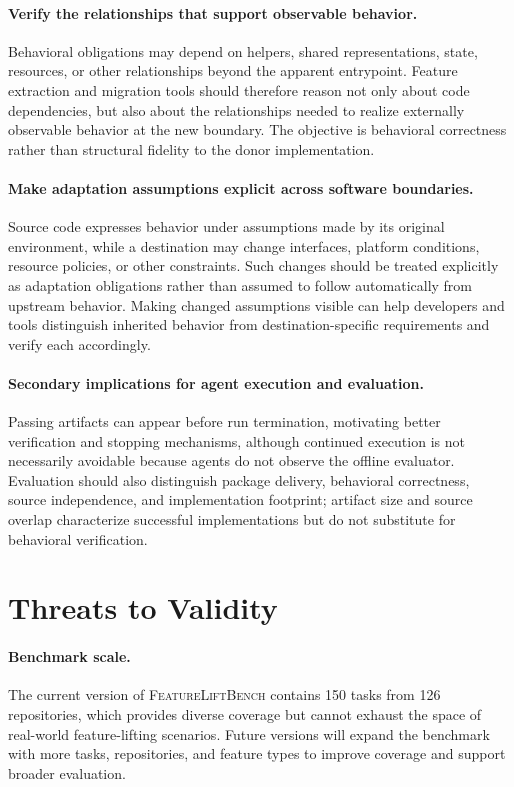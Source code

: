 \documentclass[acmsmall,screen,review,anonymous]{acmart}
\newcommand{\flb}{\textsc{FeatureLiftBench}\xspace}
\begin{document}
\paragraph{Verify the relationships that support observable behavior.}
Behavioral obligations may depend on helpers, shared representations, state,
resources, or other relationships beyond the apparent entrypoint. Feature
extraction and migration tools should therefore reason not only about code
dependencies, but also about the relationships needed to realize externally
observable behavior at the new boundary. The objective is behavioral
correctness rather than structural fidelity to the donor implementation.

\paragraph{Make adaptation assumptions explicit across software boundaries.}
Source code expresses behavior under assumptions made by its original
environment, while a destination may change interfaces, platform conditions,
resource policies, or other constraints. Such changes should be treated
explicitly as adaptation obligations rather than assumed to follow automatically
from upstream behavior. Making changed assumptions visible can help developers
and tools distinguish inherited behavior from destination-specific requirements
and verify each accordingly.

\paragraph{Secondary implications for agent execution and evaluation.}
Passing artifacts can appear before run termination, motivating better
verification and stopping mechanisms, although continued execution is not
necessarily avoidable because agents do not observe the offline evaluator.
Evaluation should also distinguish package delivery, behavioral correctness,
source independence, and implementation footprint; artifact size and source
overlap characterize successful implementations but do not substitute for
behavioral verification.

\section{Threats to Validity}
\label{sec:threats}

\paragraph{Benchmark scale.}
The current version of \flb contains 150 tasks from 126 repositories, which
provides diverse coverage but cannot exhaust the space of real-world feature-lifting
scenarios. Future versions will expand the benchmark with more tasks, repositories,
and feature types to improve coverage and support broader evaluation.
\end{document}
